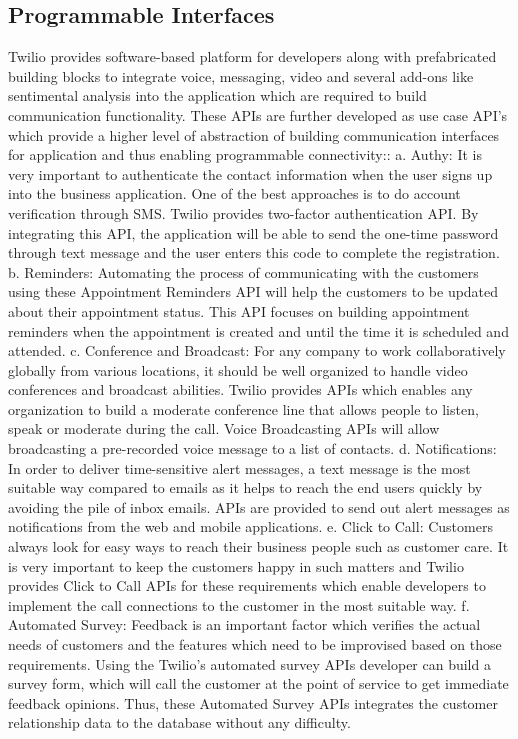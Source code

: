 \subsection{Programmable Interfaces}

Twilio provides software-based platform for developers along with 
prefabricated building blocks to integrate voice, messaging, video and 
several add-ons like sentimental analysis into the application which are 
required to build communication functionality. These APIs are further developed 
as use case API's which provide a higher level of abstraction of building 
communication interfaces for application and thus enabling programmable 
connectivity::
a. Authy: It is very important to authenticate the contact information when the 
user signs up into the business application. One of the best approaches is to do
account verification through SMS. Twilio provides two-factor authentication API.
By integrating this API, the application will be able to send the one-time 
password through text message and the user enters this code to complete the 
registration.  
b. Reminders: Automating the process of communicating with the customers using 
these Appointment Reminders API will help the customers to be updated about 
their appointment status. This API focuses on building appointment reminders 
when the appointment is created and until the time it is scheduled and attended.
c. Conference and Broadcast:
For any company to work collaboratively globally from various locations, it 
should be well organized to handle video conferences and broadcast abilities. 
Twilio provides APIs which enables any organization to build a moderate 
conference line that allows people to listen, speak or moderate during the call.
Voice Broadcasting APIs will allow broadcasting a pre-recorded voice message to 
a list of contacts.
d. Notifications:
In order to deliver time-sensitive alert messages, a text message is the most 
suitable way compared to emails as it helps to reach the end users quickly by 
avoiding the pile of inbox emails. APIs are provided to send out alert messages
as notifications from the web and mobile applications.
e. Click to Call:
Customers always look for easy ways to reach their business people such as 
customer care. It is very important to keep the customers happy in such matters 
and Twilio provides Click to Call APIs for these requirements which enable 
developers to implement the call connections to the customer in the most 
suitable way.
f. Automated Survey:
Feedback is an important factor which verifies the actual needs of customers and
the features which need to be improvised based on those requirements. Using the
Twilio's automated survey APIs developer can build a survey form, which will
call the customer at the point of service to get immediate feedback opinions. 
Thus, these Automated Survey APIs integrates the customer relationship data to
the database without any difficulty.


